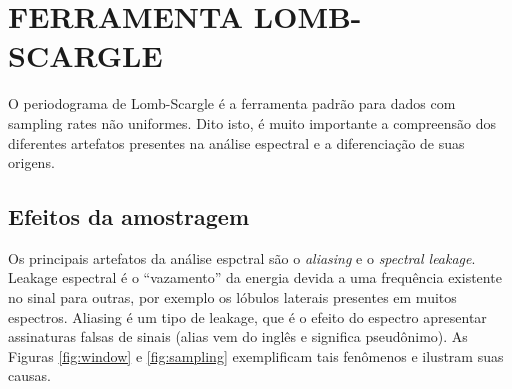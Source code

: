 
\chapter{FERRAMENTA LOMB-SCARGLE}

O periodograma de Lomb-Scargle é a ferramenta padrão para dados com sampling rates não uniformes. Dito isto, é muito importante a compreensão dos diferentes artefatos presentes na análise espectral e a diferenciação de suas origens. 

\section{Efeitos da amostragem}

Os principais artefatos da análise espctral são o \textit{aliasing} e o \textit{spectral leakage}. Leakage espectral é o ``vazamento'' da energia devida a uma frequência existente no sinal para outras, por exemplo os lóbulos laterais presentes em muitos espectros. Aliasing é um tipo de leakage, que é o efeito do espectro apresentar assinaturas falsas de sinais (alias vem do inglês e significa pseudônimo). As Figuras \ref{fig:window} e \ref{fig:sampling} exemplificam tais fenômenos e ilustram suas causas.

